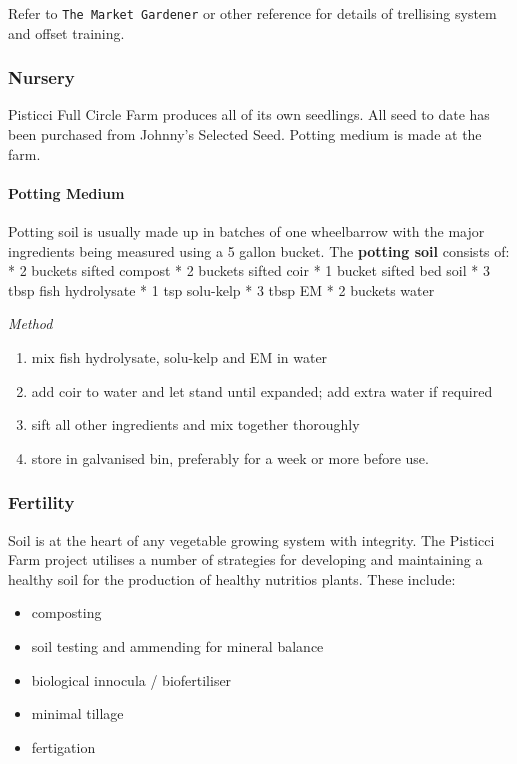 Refer to \texttt{The Market Gardener} or other reference for details of
trellising system and offset training.

\subsubsection{Nursery}\label{nursery}

Pisticci Full Circle Farm produces all of its own seedlings. All seed to
date has been purchased from Johnny's Selected Seed. Potting medium is
made at the farm.

\paragraph{Potting Medium}\label{potting-medium}

Potting soil is usually made up in batches of one wheelbarrow with the
major ingredients being measured using a 5 gallon bucket. The
\textbf{potting soil} consists of: * 2 buckets sifted compost * 2
buckets sifted coir * 1 bucket sifted bed soil * 3 tbsp fish hydrolysate
* 1 tsp solu-kelp * 3 tbsp EM * 2 buckets water

\emph{Method}

\begin{enumerate}
\def\labelenumi{\arabic{enumi}.}
\itemsep1pt\parskip0pt
\item
  mix fish hydrolysate, solu-kelp and EM in water
\item
  add coir to water and let stand until expanded; add extra water if
  required
\item
  sift all other ingredients and mix together thoroughly
\item
  store in galvanised bin, preferably for a week or more before use.
\end{enumerate}

\subsubsection{Fertility}\label{fertility}

Soil is at the heart of any vegetable growing system with integrity. The
Pisticci Farm project utilises a number of strategies for developing and
maintaining a healthy soil for the production of healthy nutritios
plants. These include:

\begin{itemize}
\itemsep1pt\parskip0pt
\item
  composting
\item
  soil testing and ammending for mineral balance
\item
  biological innocula / biofertiliser
\item
  minimal tillage
\item
  fertigation
\end{itemize}

